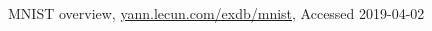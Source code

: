 \documentclass[11pt]{article} %
\begin{document}
\newpage
\begin{thebibliography}{9}



 MNIST overview, \url{yann.lecun.com/exdb/mnist}, Accessed 2019-04-02

\end{thebibliography}

\appendix
\label{appendix}


%
\end{document}
